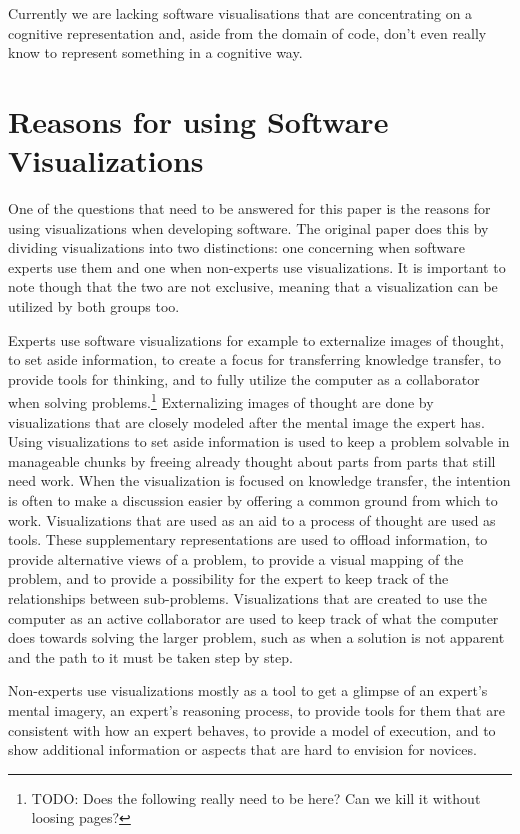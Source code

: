 \documentclass[11pt, a4paper, ngerman, twoside]{article}
\theoremstyle{plain}\newtheorem{Lemma}{Lemma}
\theoremstyle{plain}\newtheorem{Satz}[Lemma]{Satz}
\theoremstyle{definition}\newtheorem{Definition}[Lemma]{Definition}
\theoremstyle{definition}\newtheorem*{Beispiel}{Beispiel}
\theoremstyle{remark}\newtheorem*{Bemerkung}{Bemerkung}
\begin{document}
Currently we are lacking software visualisations that are concentrating on a cognitive representation and, aside from the domain of code, don't even really know to represent something in a cognitive way.


\section{Reasons for using Software Visualizations}

One of the questions that need to be answered for this paper is the reasons for using visualizations when developing software. The original paper does this by dividing visualizations into two distinctions: one concerning when software experts use them and one when non-experts use visualizations. It is important to note though that the two are not exclusive, meaning that a visualization can be utilized by both groups too.

Experts use software visualizations for example to externalize images of thought, to set aside information, to create a focus for transferring knowledge transfer, to provide tools for thinking, and to fully utilize the computer as a collaborator when solving problems.\footnote{TODO: Does the following really need to be here? Can we kill it without loosing pages?} Externalizing images of thought are done by visualizations that are closely modeled after the mental image the expert has. Using visualizations to set aside information is used to keep a problem solvable in manageable chunks by freeing already thought about parts from parts that still need work. When the visualization is focused on knowledge transfer, the intention is often to make a discussion easier by offering a common ground from which to work. Visualizations that are used as an aid to a process of thought are used as tools. These supplementary representations are used to offload information, to provide alternative views of a problem, to provide a visual mapping of the problem, and to provide a possibility for the expert to keep track of the relationships between sub-problems. Visualizations that are created to use the computer as an active collaborator are used to keep track of what the computer does towards solving the larger problem, such as when a solution is not apparent and the path to it must be taken step by step.

Non-experts use visualizations mostly as a tool to get a glimpse of an expert's mental imagery, an expert's reasoning process, to provide tools for them that are consistent with how an expert behaves, to provide a model of execution, and to show additional information or aspects that are hard to envision for novices.
\end{document}
